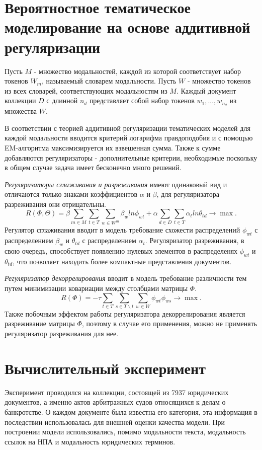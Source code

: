 \documentclass[12pt]{article}
\begin{document}
\section{Вероятностное тематическое моделирование на основе аддитивной регуляризации}

Пусть $M$ - множество модальностей, каждой из которой соответствует набор токенов $W_{m}$, называемый словарем модальности. Пусть $W$ - множество токенов из всех словарей, соответствующих модальностям из $M$. Каждый документ коллекции $D$ с длинной ${n_{d}}$  представляет собой набор токенов $w_{1},...,w_{n_{d}}$ из множества $W$.

В соответствии с теорией аддитивной регуляризации тематических моделей\cite{vorontsov2015additive} для каждой модальности вводится критерий логарифма правдоподобия и с помощью EM-алгоритма максимизируется их взвешенная сумма. Также к сумме добавляются регуляризаторы - дополнительные критерии, необходимые поскольку в общем случае задача имеет бесконечно много решений.

\emph{Регуляризаторы сглаживания и разреживания} имеют одинаковый вид и отличаются только знаками коэффициентов $\alpha$ и $\beta$, для регуляризатора разреживания они отрицательны.
\begin{equation}
R(\Phi,\Theta)=\beta \sum_{m \in M}\sum_{t \in T}\sum_{w \in W^m} \beta_{w} ln \phi_{wt} + \alpha \sum_{d \in D}\sum_{t \in T}\alpha_{t} ln\theta_{td}\to \max.
\end{equation} 
Регулятор сглаживания вводит в модель требование схожести распределений $\phi_{wt}$ с распределением $\beta_{w}$ и $\theta_{td}$ с распределением $\alpha_{t}$. Регуляризатор разреживания, в свою очередь, способствует появлению нулевых элементов в распределенях $\phi_{wt}$ и $\theta_{td}$, что позволяет находить более компактные представления документов.

\emph{Регуляризатор декоррелирования} вводит в модель требование различности тем путем минимизации ковариации между столбцами матрицы $\Phi$.
\begin{equation}
R(\Phi)=-\tau \sum_{t \in T}\sum_{s \in T\backslash t}\sum_{w \in W} \phi_{wt}\phi_{ws} \to \max.
\end{equation} 
Также побочным эффектом работы регуляризатора декоррелирования является разреживание матрицы $\Phi$, поэтому в случае его применения, можно не применять регуляризатор разреживания для нее.

\section{Вычислительный эксперимент}
Эксперимент проводился на коллекции, состоящей из 7937 юридических документов, а именно актов арбитражных судов относящихся к делам о банкротстве. О каждом документе была известна его категория, 
эта информация в последствии использовалась для внешней оценки качества модели. При построении модели использовались, помимо модальности текста, модальность ссылок на НПА и модальность юридических терминов. 
\end{document}
